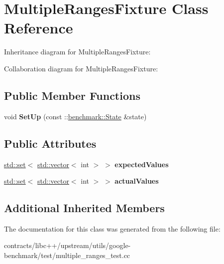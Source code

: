 \hypertarget{class_multiple_ranges_fixture}{}\section{Multiple\+Ranges\+Fixture Class Reference}
\label{class_multiple_ranges_fixture}


Inheritance diagram for Multiple\+Ranges\+Fixture\+:


Collaboration diagram for Multiple\+Ranges\+Fixture\+:
\subsection*{Public Member Functions}
\begin{DoxyCompactItemize}
\item 
\mbox{\label{class_multiple_ranges_fixture_ac26c8787f594224a069c04d7fe0a5503}} 
void {\bfseries Set\+Up} (const \+::\mbox{\hyperlink{classbenchmark_1_1_state}{benchmark\+::\+State}} \&state)
\end{DoxyCompactItemize}
\subsection*{Public Attributes}
\begin{DoxyCompactItemize}
\item 
\mbox{\label{class_multiple_ranges_fixture_a99263f50bd5b6523818436563e9be56a}} 
\mbox{\hyperlink{classstd_1_1set}{std\+::set}}$<$ \mbox{\hyperlink{classstd_1_1vector}{std\+::vector}}$<$ int $>$ $>$ {\bfseries expected\+Values}
\item 
\mbox{\label{class_multiple_ranges_fixture_ad3a6528f5dacf64e76a1ec58347ad45a}} 
\mbox{\hyperlink{classstd_1_1set}{std\+::set}}$<$ \mbox{\hyperlink{classstd_1_1vector}{std\+::vector}}$<$ int $>$ $>$ {\bfseries actual\+Values}
\end{DoxyCompactItemize}
\subsection*{Additional Inherited Members}


The documentation for this class was generated from the following file\+:\begin{DoxyCompactItemize}
\item 
contracts/libc++/upstream/utils/google-\/benchmark/test/multiple\+\_\+ranges\+\_\+test.\+cc\end{DoxyCompactItemize}
